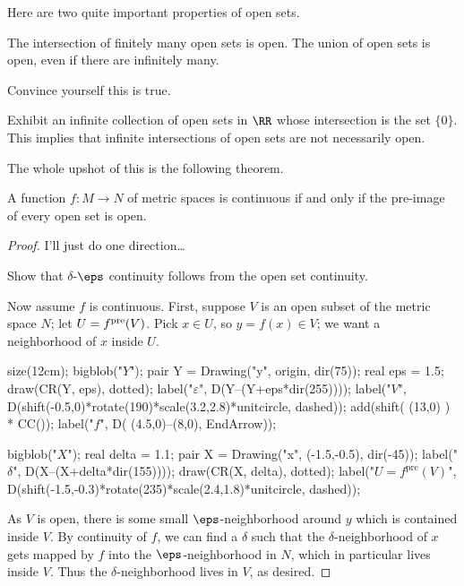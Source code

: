 Here are two quite important properties of open sets.
\begin{proposition}
	\listhack
	\begin{enumerate}[(a)]
		\ii The intersection of finitely many open sets is open.
		\ii The union of open sets is open, even if there are infinitely many.
	\end{enumerate}
\end{proposition}
\begin{ques}
	Convince yourself this is true.
\end{ques}
\begin{exercise}
	Exhibit an infinite collection of open sets in $\RR$
	whose intersection is the set $\{0\}$.
	This implies that infinite intersections of open sets are not necessarily open.
\end{exercise}

The whole upshot of this is the following theorem.
\begin{theorem}
	A function $f : M \to N$ of metric spaces is continuous
	if and only if the pre-image of every open set is open.
\end{theorem}
\begin{proof}
	I'll just do one direction\dots
	\begin{exercise}
		Show that $\delta$-$\eps$ continuity follows from
		the open set continuity.
	\end{exercise}
	Now assume $f$ is continuous.
	First, suppose $V$ is an open subset of the metric space $N$;
	let $U = f^{\text{pre}}(V)$. Pick $x \in U$, so $y = f(x) \in V$; we want a neighborhood of $x$ inside $U$.

	\begin{center}
		\begin{asy}
			size(12cm);
			bigblob("$Y$");
			pair Y = Drawing("y", origin, dir(75));
			real eps = 1.5;
			draw(CR(Y, eps), dotted);
			label("$\varepsilon$", D(Y--(Y+eps*dir(255))));
			label("$V$",
				D(shift(-0.5,0)*rotate(190)*scale(3.2,2.8)*unitcircle, dashed));
			add(shift( (13,0) ) * CC());
			label("$f$", D( (4.5,0)--(8,0), EndArrow));

			bigblob("$X$");
			real delta = 1.1;
			pair X = Drawing("x", (-1.5,-0.5), dir(-45));
			label("$\delta$", D(X--(X+delta*dir(155))));
			draw(CR(X, delta), dotted);
			label("$U = f^{\text{pre}}(V)$",
				D(shift(-1.5,-0.3)*rotate(235)*scale(2.4,1.8)*unitcircle, dashed));
		\end{asy}
	\end{center}

	As $V$ is open, there is some small $\eps$-neighborhood around $y$
	which is contained inside $V$.
	By continuity of $f$, we can find a $\delta$ such that the $\delta$-neighborhood
	of $x$ gets mapped by $f$ into the $\eps$-neighborhood in $N$, 
	which in particular lives inside $V$.
	Thus the $\delta$-neighborhood lives in $V$, as desired.
\end{proof}

